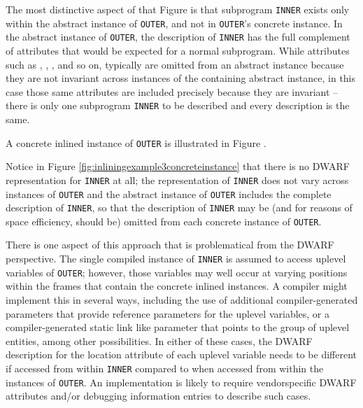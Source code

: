 The most distinctive aspect of that Figure is that subprogram
\texttt{INNER} exists only within the abstract instance of \texttt{OUTER},
and not in \texttt{OUTER}\textquoteright s concrete instance. In the abstract
instance of \texttt{OUTER}, the description of \texttt{INNER} has the full
complement of attributes that would be expected for a
normal subprogram. 
While attributes such as 
\DWATlowpc,
\DWAThighpc, 
\DWATlocation,
and so on, typically are omitted
from 
an 
abstract instance because they are not invariant across
instances of the containing abstract instance, in this case
those same attributes are included precisely because they are
invariant -- there is only one subprogram \texttt{INNER} to be described
and every description is the same.

A concrete inlined instance of \texttt{OUTER} is illustrated in
Figure .

Notice in 
Figure \ref{fig:inliningexample3concreteinstance}
that there is no DWARF representation for
\texttt{INNER} at all; the representation of \texttt{INNER} does not vary across
instances of \texttt{OUTER} and the abstract instance of \texttt{OUTER} includes
the complete description of \texttt{INNER}, so that the description of
\texttt{INNER} may be (and for reasons of space efficiency, should be)
omitted from each 
concrete instance of \texttt{OUTER}.

There is one aspect of this approach that is problematical from
the DWARF perspective. The single compiled instance of \texttt{INNER}
is assumed to access up\dash level variables of \texttt{OUTER}; however,
those variables may well occur at varying positions within
the frames that contain the 
concrete inlined instances. A
compiler might implement this in several ways, including the
use of additional compiler-generated parameters that provide
reference parameters for the up\dash level variables, or a 
compiler-generated static link like parameter that points to the group
of up\dash level entities, among other possibilities. In either of
these cases, the DWARF description for the location attribute
of each uplevel variable needs to be different if accessed
from within \texttt{INNER} compared to when accessed from within the
instances of \texttt{OUTER}. An implementation is likely to require
vendor\dash specific DWARF attributes and/or debugging information
entries to describe such cases.

